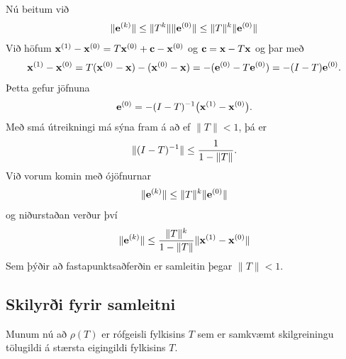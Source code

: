 \documentclass[letterpaper,10pt,icelandic]{sphinxmanual}
\begin{document}
Nú beitum við
\begin{gather}
\begin{split}\|\mbox{${\bf e}$}^{(k)}\| \leq \|T^{k}\|\|\mbox{${\bf e}$}^{(0)}\|\leq \|T\|^{k}\|\mbox{${\bf e}$}^{(0)}\|\end{split}\notag
\end{gather}
Við höfum
\(\mbox{${\bf x}$}^{(1)}-\mbox{${\bf x}$}^{(0)}=T\mbox{${\bf x}$}^{(0)}+\mbox{${\bf c}$}-\mbox{${\bf x}$}^{(0)}\)
og \(\mbox{${\bf c}$}=\mbox{${\bf x}$}-T\mbox{${\bf x}$}\) og þar
með
\begin{gather}
\begin{split}\mbox{${\bf x}$}^{(1)}-\mbox{${\bf x}$}^{(0)}=T(\mbox{${\bf x}$}^{(0)}-\mbox{${\bf x}$})-(\mbox{${\bf x}$}^{(0)}-\mbox{${\bf x}$})=
-(\mbox{${\bf e}$}^{(0)}-T\mbox{${\bf e}$}^{(0)})=-(I-T)\mbox{${\bf e}$}^{(0)}.\end{split}\notag
\end{gather}
Þetta gefur jöfnuna
\begin{gather}
\begin{split}\mbox{${\bf e}$}^{(0)}=-(I-T)^{-1} \big(\mbox{${\bf x}$}^{(1)}-\mbox{${\bf x}$}^{(0)}\big).\end{split}\notag
\end{gather}
Með smá útreikningi má sýna fram á að ef \(\|T\|<1\), þá er
\begin{gather}
\begin{split}\|(I-T)^{-1}\|\leq \dfrac 1{1-\|T\|}.\end{split}\notag
\end{gather}
Við vorum komin með ójöfnurnar
\begin{gather}
\begin{split}\|\mbox{${\bf e}$}^{(k)}\| \leq \|T\|^{k}\|\mbox{${\bf e}$}^{(0)}\|\end{split}\notag
\end{gather}
og niðurstaðan verður því
\begin{gather}
\begin{split}\|\mbox{${\bf e}$}^{(k)}\| \leq \dfrac{\|T\|^{k}}{1-\|T\|}
\|\mbox{${\bf x}$}^{(1)}-\mbox{${\bf x}$}^{(0)}\|\end{split}\notag
\end{gather}
Sem þýðir að fastapunktsaðferðin er samleitin þegar \(\|T\|<1\).


\subsection{Skilyrði fyrir samleitni}
\label{kafli08:skilyri-fyrir-samleitni}
Munum nú að \(\rho(T)\) er rófgeisli fylkisins \(T\) sem er
samkvæmt skilgreiningu tölugildi á stærsta eigingildi fylkisins
\(T\).
\end{document}
